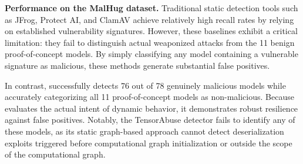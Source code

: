 \noindent \textbf{Performance on the MalHug dataset.} Traditional static detection tools such as JFrog, Protect AI, and ClamAV achieve relatively high recall rates by relying on established vulnerability signatures. However, these baselines exhibit a critical limitation: they fail to distinguish actual weaponized attacks from the 11 benign proof-of-concept models. By simply classifying any model containing a vulnerable signature as malicious, these methods generate substantial false positives.

In contrast, \toolname{} successfully detects 76 out of 78 genuinely malicious models while accurately categorizing all 11 proof-of-concept models as non-malicious. Because \toolname{} evaluates the actual intent of dynamic behavior, it demonstrates robust resilience against false positives. Notably, the TensorAbuse detector fails to identify any of these models, as its static graph-based approach cannot detect deserialization exploits triggered before computational graph initialization or outside the scope of the computational graph.

\begin{table}[t!]
    \scriptsize
    \centering
    \caption{Detected malicious models on the TensorAbuse Synthetic Dataset by attack type (40 per type).}
    \label{tab:synthetic_result}
\end{table}

